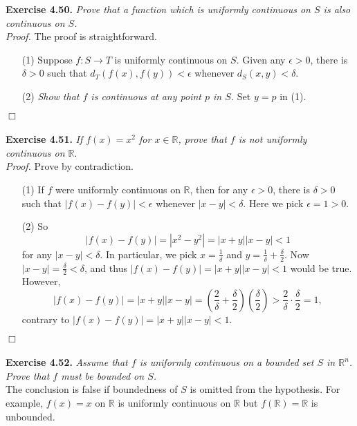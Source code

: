 \documentclass{article}
\begin{document}
\textbf{Exercise 4.50.}
\emph{Prove that a function which is uniformly continuous on $S$
is also continuous on $S$.} \\

\emph{Proof.}
The proof is straightforward.
\begin{enumerate}
\item[(1)]
Suppose $f: S \rightarrow T$ is uniformly continuous on $S$.
Given any $\epsilon > 0$, there is $\delta > 0$ such that
$d_T(f(x), f(y)) < \epsilon$ whenever $d_S(x, y) < \delta$.
\item[(2)]
\emph{Show that $f$ is continuous at any point $p$ in $S$.}
Set $y = p$ in (1).
\end{enumerate}
$\Box$ \\\\



\textbf{Exercise 4.51.}
\emph{If $f(x) = x^2$ for $x \in \mathbb{R}$,
prove that $f$ is not uniformly continuous on $\mathbb{R}$}. \\

\emph{Proof.}
Prove by contradiction.
\begin{enumerate}
\item[(1)]
If $f$ were uniformly continuous on $\mathbb{R}$,
then for any $\epsilon > 0$, there is $\delta > 0$ such that
$|f(x) - f(y)| < \epsilon$ whenever $|x - y| < \delta$.
Here we pick $\epsilon = 1 > 0$.
\item[(2)]
So
$$|f(x) - f(y)| = |x^2 - y^2| = |x+y||x-y| < 1$$
for any $|x-y| < \delta$.
In particular, we pick $x = \frac{1}{\delta}$
and $y = \frac{1}{\delta} + \frac{\delta}{2}$.
Now $|x-y| = \frac{\delta}{2} < \delta$, and thus $|f(x) - f(y)| = |x+y||x-y| < 1$
would be true.
However,
$$|f(x) - f(y)| = |x+y||x-y|
= \left(\frac{2}{\delta}+ \frac{\delta}{2}\right)
\left(\frac{\delta}{2}\right)
> \frac{2}{\delta} \cdot \frac{\delta}{2} = 1,$$
contrary to $|f(x) - f(y)| = |x+y||x-y| < 1$.
\end{enumerate}
$\Box$ \\\\



\textbf{Exercise 4.52.}
\emph{Assume that $f$ is uniformly continuous on a bounded set $S$ in $\mathbb{R}^n$.
Prove that $f$ must be bounded on $S$.} \\

The conclusion is false if boundedness of $S$ is omitted from the hypothesis.
For example, $f(x) = x$ on $\mathbb{R}$ is uniformly continuous on $\mathbb{R}$
but $f(\mathbb{R}) = \mathbb{R}$ is unbounded. \\
\end{document}
